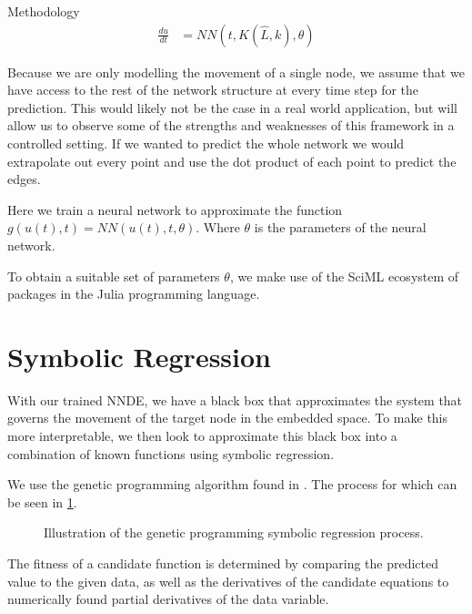 \documentclass[12pt]{amsbook}
\begin{document}
\begin{chapter}{Methodology}
        \begin{align}
            \frac{du}{dt} &= NN(t, K(\hat L, k), \theta)
        \end{align}

        Because we are only modelling the movement of a single node, we assume that we have access to the rest of the network structure at every time step for the prediction. This would likely not be the case in a real world application, but will allow us to observe some of the strengths and weaknesses of this framework in a controlled setting. If we wanted to predict the whole network we would extrapolate out every point and use the dot product of each point to predict the edges.
        
        Here we train a neural network to approximate the function $g(u(t),t)=NN(u(t),t,\theta)$. Where $\theta$ is the parameters of the neural network.

        
        To obtain a suitable set of parameters $\theta$, we make use of the SciML ecosystem of packages in the Julia programming language\cite{SciML_C_Rak}.    


    
    \section{Symbolic Regression}
        With our trained NNDE, we have a black box that approximates the system that governs the movement of the target node in the embedded space. To make this more interpretable, we then look to approximate this black box into a combination of known functions using symbolic regression\cite{pysr}.
        
        We use the genetic programming algorithm found in \cite{pysr}. The process for which can be seen in \cref{symbreg}.

        \begin{figure}
            \centering
            \resizebox{\width}{!}{}
            \caption{Illustration of the genetic programming symbolic regression process.}
            \label{symbreg}
        \end{figure}
        
        The fitness of a candidate function is determined by comparing the predicted value to the given data, as well as the derivatives of the candidate equations to numerically found partial derivatives of the data variable.


\end{chapter}
\end{document}
